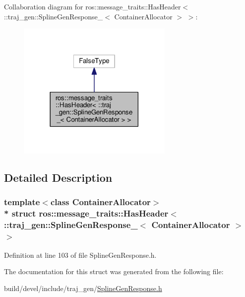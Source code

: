 Collaboration diagram for ros\+:\+:message\+\_\+traits\+:\+:Has\+Header$<$ \+:\+:traj\+\_\+gen\+:\+:Spline\+Gen\+Response\+\_\+$<$ Container\+Allocator $>$ $>$\+:
\nopagebreak
\begin{figure}[H]
\begin{center}
\leavevmode
\includegraphics[width=213pt]{structros_1_1message__traits_1_1_has_header_3_01_1_1traj__gen_1_1_spline_gen_response___3_01_con0e8df4f2049cc64a66408ceeca784037}
\end{center}
\end{figure}


\subsection{Detailed Description}
\subsubsection*{template$<$class Container\+Allocator$>$\\*
struct ros\+::message\+\_\+traits\+::\+Has\+Header$<$ \+::traj\+\_\+gen\+::\+Spline\+Gen\+Response\+\_\+$<$ Container\+Allocator $>$ $>$}



Definition at line 103 of file Spline\+Gen\+Response.\+h.



The documentation for this struct was generated from the following file\+:\begin{DoxyCompactItemize}
\item 
build/devel/include/traj\+\_\+gen/\hyperlink{_spline_gen_response_8h}{Spline\+Gen\+Response.\+h}\end{DoxyCompactItemize}
